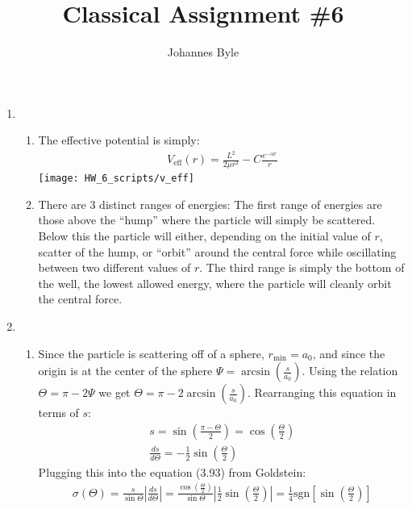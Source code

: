 \documentclass[12pt]{article}
\title{Classical Assignment \#6}
\author{Johannes Byle}
\newcommand{\der}[2]{\frac{d #1}{d #2}}
\begin{document}
    \maketitle
    \begin{enumerate}
        \item
        \begin{enumerate}
            \item The effective potential is simply:
            \begin{gather*}
                V_{\text{eff}}(r)=\frac{L^2}{2\mu r^2}-C\frac{e^{-\alpha r}}{r}
            \end{gather*}
            \texttt{[image: HW\_6\_scripts/v\_eff]}
            \item
            There are 3 distinct ranges of energies:
            The first range of energies are those above the \enquote{hump} where the particle will simply be scattered.
            Below this the particle will either, depending on the initial value of $r$, scatter of the hump, or \enquote{orbit} around the central force while oscillating between two different values of $r$.
            The third range is simply the bottom of the well, the lowest allowed energy, where the particle will cleanly orbit the central force.
        \end{enumerate}
        \item
        \begin{enumerate}
            \item Since the particle is scattering off of a sphere, $r_{\min}=a_0$, and since the origin is at the center of the sphere $\Psi=\arcsin\left( \frac{s}{a_0} \right)$.
            Using the relation $\Theta=\pi-2\Psi$ we get $\Theta=\pi-2\arcsin\left( \frac{s}{a_0} \right)$.
            Rearranging this equation in terms of $s$:
            \begin{gather*}
                s=\sin\left(\frac{\pi-\Theta}{2}\right)=\cos\left( \frac{\Theta}{2} \right)\\
                \der{s}{\Theta}=-\frac{1}{2}\sin\left( \frac{\Theta}{2} \right)
            \end{gather*}
            Plugging this into the equation (3.93) from Goldstein:
            \begin{gather*}
                \sigma(\Theta)=\frac{s}{\sin\Theta}\left| \frac{ds}{d\Theta} \right|=\frac{\cos\left( \frac{\Theta}{2} \right)}{\sin\Theta}\left| \frac{1}{2}\sin\left( \frac{\Theta}{2} \right) \right|=\frac{1}{4}\text{sgn}\left[\sin\left( \frac{\Theta}{2} \right)\right]\\

\end{gather*}
\end{enumerate}
\end{enumerate}
\end{document}
